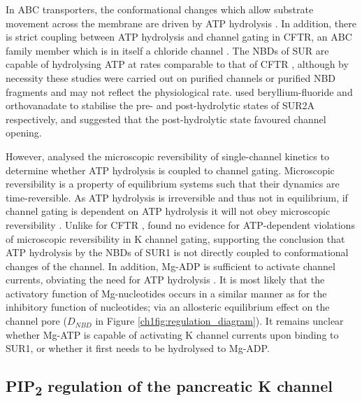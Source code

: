 In ABC transporters, the conformational changes which allow substrate movement across the membrane are driven by ATP hydrolysis \cite{rees_abc_2009}.
In addition, there is strict coupling between ATP hydrolysis and channel gating in CFTR, an ABC family member which is in itself a chloride channel \cite{csanady_strict_2010-1}.
The NBDs of SUR are capable of hydrolysing ATP at rates comparable to that of CFTR \cite{matsuo_atp_1999, wet_studies_2007, puljung_cryo-electron_2018}, although by necessity these studies were carried out on purified channels or purified NBD fragments and may not reflect the physiological rate.
\textcite{zingman_signaling_2001-1} used beryllium-fluoride and orthovanadate to stabilise the pre- and post-hydrolytic states of SUR2A respectively, and suggested that the post-hydrolytic state favoured channel opening.

However, \textcite{choi_testing_2008} analysed the microscopic reversibility of single-channel kinetics to determine whether ATP hydrolysis is coupled to channel gating.
Microscopic reversibility is a property of equilibrium systems such that their dynamics are time-reversible.
As ATP hydrolysis is irreversible and thus not in equilibrium, if channel gating is dependent on ATP hydrolysis it will not obey microscopic reversibility \cite{rothberg_testing_2001}.
Unlike for CFTR \cite{csanady_strict_2010-1}, \textcite{choi_testing_2008} found no evidence for ATP-dependent violations of microscopic reversibility in K\ATP{} channel gating, supporting the conclusion that ATP hydrolysis by the NBDs of SUR1 is not directly coupled to conformational changes of the channel.
In addition, Mg-ADP is sufficient to activate channel currents, obviating the need for ATP hydrolysis \cite{proks_activation_2010-1}.
It is most likely that the activatory function of Mg-nucleotides occurs in a similar manner as for the inhibitory function of nucleotides; via an allosteric equilibrium effect on the channel pore ($D_{NBD}$ in Figure \ref{ch1fig:regulation_diagram}).
It remains unclear whether Mg-ATP is capable of activating K\ATP{} channel currents upon binding to SUR1, or whether it first needs to be hydrolysed to Mg-ADP.

\subsection{PIP\textsubscript{2} regulation of the pancreatic K\ATP{} channel}

